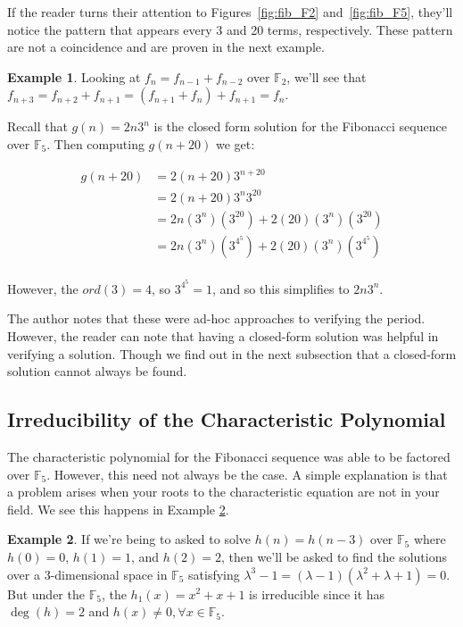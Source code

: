 \documentclass[a4paper]{article}
\theoremstyle{definition}
\newtheorem{example}{Example}[section]
\begin{document}
If the reader turns their attention to Figures~\ref{fig:fib_F2} and~\ref{fig:fib_F5}, they'll notice the
pattern that appears every 3 and 20 terms, respectively. These pattern are not a coincidence and are
proven in the next example.
\\

\begin{example}
Looking at $f_n=f_{n-1}+f_{n-2}$ over $\mathbb{F}_2$, we'll see that
$f_{n+3}=f_{n+2}+f_{n+1}=(f_{n+1}+f_{n})+f_{n+1}=f_{n}$.

Recall that $g(n)=2n3^n$ is the closed form solution for the Fibonacci sequence over $\mathbb{F}_5$.
Then computing $g(n+20)$ we get:

\begin{align*}
g(n+20)
&=2(n+20)3^{n+20} \\
&=2(n+20)3^n3^{20} \\
&=2n(3^n)(3^{20})+2(20)(3^n)(3^{20}) \\
&=2n(3^n)(3^{4^{5}})+2(20)(3^n)(3^{4^{5}}) \\
\end{align*}

However, the $ord(3)=4$, so $3^{4^{5}}=1$, and so this simplifies to $2n3^n$. 
\label{ex:period_fib_F5}
\end{example}

The author notes that these were ad-hoc approaches to verifying the period. However, the reader can note
that having a closed-form solution was helpful in verifying a solution. Though we find out in the next
subsection that a closed-form solution cannot always be found.

\subsection{Irreducibility of the Characteristic Polynomial}

The characteristic polynomial for the Fibonacci sequence was able to be factored over $\mathbb{F}_5$.
However, this need not always be the case. A simple explanation is that a problem arises when your roots
to the characteristic equation are not in your field. We see this happens in Example
\ref{ex:cubic-irred}.
\\

\begin{example}
If we're being to asked to solve $h(n)=h(n-3)$ over $\mathbb{F}_5$ where $h(0)=0$, $h(1)=1$, and $h(2)=2$,
then we'll be asked to find the solutions over a 3-dimensional space in $\mathbb{F}_5$ satisfying
$\lambda^{3}-1=(\lambda-1)(\lambda^2+\lambda+1)=0$. But under the $\mathbb{F}_5$, the $h_1(x)=x^2+x+1$ is
irreducible since it has $\deg(h)=2$ and $h(x)\ne 0, \forall x\in \mathbb{F}_5$. 
\label{ex:cubic-irred}
\end{example}
\end{document}

